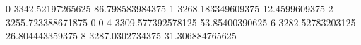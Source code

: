 0 3342.52197265625 86.798583984375
1 3268.183349609375 12.4599609375
2 3255.723388671875 0.0
4 3309.577392578125 53.85400390625
6 3282.52783203125 26.804443359375
8 3287.0302734375 31.306884765625
